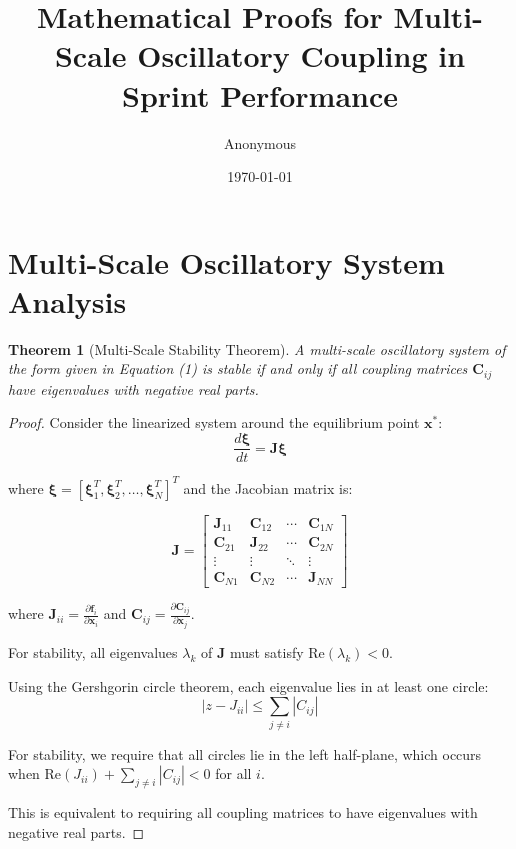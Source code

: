 \documentclass{article}
\title{Mathematical Proofs for Multi-Scale Oscillatory Coupling in Sprint Performance}
\author{Anonymous}
\date{\today}
\newtheorem{theorem}{Theorem}
\begin{document}
\maketitle

\section{Multi-Scale Oscillatory System Analysis}

\begin{theorem}[Multi-Scale Stability Theorem]
A multi-scale oscillatory system of the form given in Equation (1) is stable if and only if all coupling matrices $\mathbf{C}_{ij}$ have eigenvalues with negative real parts.
\end{theorem}

\begin{proof}
Consider the linearized system around the equilibrium point $\mathbf{x}^*$:
\begin{equation}
\frac{d\boldsymbol{\xi}}{dt} = \mathbf{J}\boldsymbol{\xi}
\end{equation}

where $\boldsymbol{\xi} = [\boldsymbol{\xi}_1^T, \boldsymbol{\xi}_2^T, \ldots, \boldsymbol{\xi}_N^T]^T$ and the Jacobian matrix is:

\begin{equation}
\mathbf{J} = \begin{bmatrix}
\mathbf{J}_{11} & \mathbf{C}_{12} & \cdots & \mathbf{C}_{1N} \\
\mathbf{C}_{21} & \mathbf{J}_{22} & \cdots & \mathbf{C}_{2N} \\
\vdots & \vdots & \ddots & \vdots \\
\mathbf{C}_{N1} & \mathbf{C}_{N2} & \cdots & \mathbf{J}_{NN}
\end{bmatrix}
\end{equation}

where $\mathbf{J}_{ii} = \frac{\partial \mathbf{f}_i}{\partial \mathbf{x}_i}$ and $\mathbf{C}_{ij} = \frac{\partial \mathbf{C}_{ij}}{\partial \mathbf{x}_j}$.

For stability, all eigenvalues $\lambda_k$ of $\mathbf{J}$ must satisfy $\text{Re}(\lambda_k) < 0$.

Using the Gershgorin circle theorem, each eigenvalue lies in at least one circle:
\begin{equation}
|z - J_{ii}| \leq \sum_{j \neq i} |C_{ij}|
\end{equation}

For stability, we require that all circles lie in the left half-plane, which occurs when $\text{Re}(J_{ii}) + \sum_{j \neq i} |C_{ij}| < 0$ for all $i$.

This is equivalent to requiring all coupling matrices to have eigenvalues with negative real parts.
\end{proof}
\end{document}
